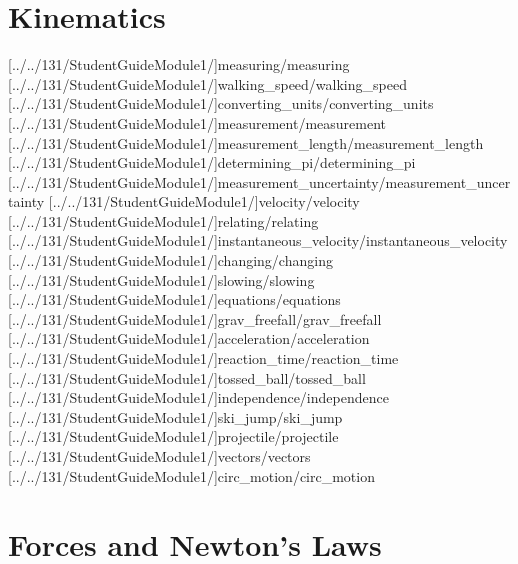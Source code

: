 \documentclass[english,twoside]{article}
\begin{document}


\setcounter{tocdepth}{1}\tableofcontents{}
\cleardoublepage

\ForOneTwentyFivetrue

\part{Kinematics}

[../../131/StudentGuideModule1/]{measuring/measuring} 
[../../131/StudentGuideModule1/]{walking_speed/walking_speed}
[../../131/StudentGuideModule1/]{converting_units/converting_units}
[../../131/StudentGuideModule1/]{measurement/measurement}
[../../131/StudentGuideModule1/]{measurement_length/measurement_length}
[../../131/StudentGuideModule1/]{determining_pi/determining_pi}
[../../131/StudentGuideModule1/]{measurement_uncertainty/measurement_uncertainty}
[../../131/StudentGuideModule1/]{velocity/velocity}
[../../131/StudentGuideModule1/]{relating/relating}
[../../131/StudentGuideModule1/]{instantaneous_velocity/instantaneous_velocity} %
[../../131/StudentGuideModule1/]{changing/changing}
[../../131/StudentGuideModule1/]{slowing/slowing}
[../../131/StudentGuideModule1/]{equations/equations} %
[../../131/StudentGuideModule1/]{grav_freefall/grav_freefall}
[../../131/StudentGuideModule1/]{acceleration/acceleration}
[../../131/StudentGuideModule1/]{reaction_time/reaction_time}
[../../131/StudentGuideModule1/]{tossed_ball/tossed_ball}
[../../131/StudentGuideModule1/]{independence/independence}
[../../131/StudentGuideModule1/]{ski_jump/ski_jump}
[../../131/StudentGuideModule1/]{projectile/projectile}
[../../131/StudentGuideModule1/]{vectors/vectors}
[../../131/StudentGuideModule1/]{circ_motion/circ_motion}

\part{Forces and Newton's Laws}
\end{document}
